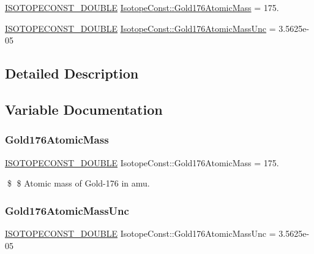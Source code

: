 \begin{DoxyCompactItemize}
\item 
\mbox{\hyperlink{group___isotope_const-_macros_ga8f45a7272ce02c0b4c65c44636ed719a}{I\+S\+O\+T\+O\+P\+E\+C\+O\+N\+S\+T\+\_\+\+D\+O\+U\+B\+LE}} \mbox{\hyperlink{group___isotope_const-_gold-_au176_ga9ed953718c43276474fd0ae0ee2f8c8c}{Isotope\+Const\+::\+Gold176\+Atomic\+Mass}} = 175.
\item 
\mbox{\hyperlink{group___isotope_const-_macros_ga8f45a7272ce02c0b4c65c44636ed719a}{I\+S\+O\+T\+O\+P\+E\+C\+O\+N\+S\+T\+\_\+\+D\+O\+U\+B\+LE}} \mbox{\hyperlink{group___isotope_const-_gold-_au176_ga2a116734b340c2e5529e6d82a23d95f9}{Isotope\+Const\+::\+Gold176\+Atomic\+Mass\+Unc}} = 3.\+5625e-\/05
\end{DoxyCompactItemize}


\subsection{Detailed Description}


\subsection{Variable Documentation}
\mbox{\label{group___isotope_const-_gold-_au176_ga9ed953718c43276474fd0ae0ee2f8c8c}} 
\subsubsection{\texorpdfstring{Gold176\+Atomic\+Mass}{Gold176AtomicMass}}
{\footnotesize\ttfamily \mbox{\hyperlink{group___isotope_const-_macros_ga8f45a7272ce02c0b4c65c44636ed719a}{I\+S\+O\+T\+O\+P\+E\+C\+O\+N\+S\+T\+\_\+\+D\+O\+U\+B\+LE}} Isotope\+Const\+::\+Gold176\+Atomic\+Mass = 175.}

\$ \$ Atomic mass of Gold-\/176 in amu. \mbox{\label{group___isotope_const-_gold-_au176_ga2a116734b340c2e5529e6d82a23d95f9}} 
\subsubsection{\texorpdfstring{Gold176\+Atomic\+Mass\+Unc}{Gold176AtomicMassUnc}}
{\footnotesize\ttfamily \mbox{\hyperlink{group___isotope_const-_macros_ga8f45a7272ce02c0b4c65c44636ed719a}{I\+S\+O\+T\+O\+P\+E\+C\+O\+N\+S\+T\+\_\+\+D\+O\+U\+B\+LE}} Isotope\+Const\+::\+Gold176\+Atomic\+Mass\+Unc = 3.\+5625e-\/05}

